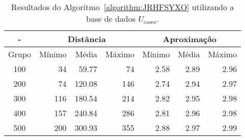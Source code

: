 \begin{table}[!htb]
  \caption{Resultados do Algoritmo~\ref{algorithm:JRHFSYXO} utilizando a base de dados $U_{\text{cases}}$.}
  \label{table:JCSOIDPK}
  \centering
  \begin{tabular}{|c|r|r|r|r|r|r|}
    \hline
      -      & \multicolumn{3}{c|}{Distância}             & \multicolumn{3}{c|}{Aproximação}           \\ \hline
    Grupo    & Mínimo       & Média        & Máximo       & Mínimo       & Média        & Máximo       \\ \hline  
    100      &  34          &  59.77       &  74          & 2.58         & 2.89         & 2.96         \\ \hline
    200      &  74          & 120.08       & 146          & 2.74         & 2.94         & 2.97         \\ \hline
    300      & 116          & 180.54       & 214          & 2.82         & 2.95         & 2.98         \\ \hline
    400      & 157          & 240.84       & 286          & 2.81         & 2.96         & 2.98         \\ \hline
    500      & 200          & 300.93       & 355          & 2.88         & 2.97         & 2.99         \\ \hline    
  \end{tabular}
\end{table}
